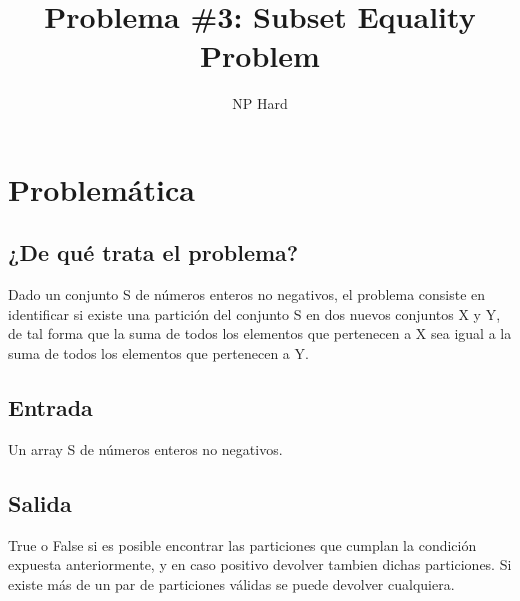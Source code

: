 \documentclass[11pt]{article}
\author{
    NP Hard
    }
\title{Problema \#3: Subset Equality Problem}
\begin{document}
    \maketitle
    \newpage

    \section{Problemática}
    \subsection{¿De qué trata el problema?}
    Dado un conjunto S de números enteros no negativos, el problema consiste en identificar si existe una
    partición del conjunto S en dos nuevos conjuntos X y Y, de tal forma que la suma de todos los elementos
    que pertenecen a X sea igual a la suma de todos los elementos que pertenecen a Y.
    
    \subsection{Entrada}
    Un array S de números enteros no negativos.
    
    \subsection{Salida}
    True o False si es posible encontrar las particiones que cumplan la condición expuesta anteriormente, y en
    caso positivo devolver tambien dichas particiones. Si existe más de un par de particiones válidas se puede 
    devolver cualquiera.
    
    
\end{document}

